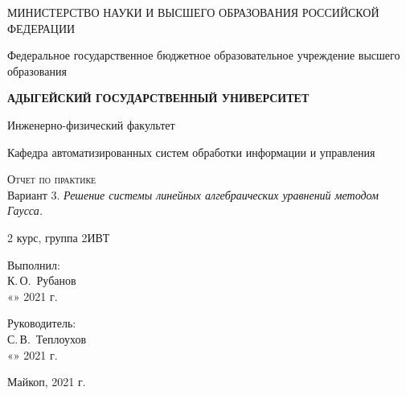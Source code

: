 \documentclass[12pt,a4paper]{scrartcl}
\begin{document}
	\begin{titlepage}
		\begin{center}
			\large
			МИНИСТЕРСТВО НАУКИ И ВЫСШЕГО ОБРАЗОВАНИЯ РОССИЙСКОЙ ФЕДЕРАЦИИ
			
			Федеральное государственное бюджетное образовательное учреждение высшего образования
			
			\textbf{АДЫГЕЙСКИЙ ГОСУДАРСТВЕННЫЙ УНИВЕРСИТЕТ}
			\vspace{0.25cm}
			
			Инженерно-физический факультет
			
			Кафедра автоматизированных систем обработки информации и управления
			\vfill

			\vfill
			
			\textsc{Отчет по практике}\\[5mm]
			
			{\LARGE Вариант 3. \textit{Решение системы линейных алгебраических уравнений методом Гаусса.}}
			\bigskip
			
			2 курс, группа 2ИВТ
		\end{center}
		\vfill
		
		\newlength{\ML}
		\hfill\begin{minipage}{0.5\textwidth}
			Выполнил:\\
			\underline{\hspace{\ML}} К.\,О.~Рубанов\\
			«\underline{\hspace{0.7cm}}» \underline{\hspace{2cm}} 2021 г.
		\end{minipage}%
		\bigskip
		
		\hfill\begin{minipage}{0.5\textwidth}
			Руководитель:\\
			\underline{\hspace{\ML}} С.\,В.~Теплоухов\\
			«\underline{\hspace{0.7cm}}» \underline{\hspace{2cm}} 2021 г.
		\end{minipage}%
		\vfill
		
		\begin{center}
			Майкоп, 2021 г.
		\end{center}
	\end{titlepage}
\end{document}
